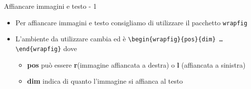 \begin{frame}{Affiancare immagini e testo - 1}

\begin{itemize}
	\item Per affiancare immagini e testo consigliamo di utilizzare il pacchetto 
	\texttt{wrapfig}
	\item L'ambiente da utilizzare cambia ed è
	\texttt{\textbackslash{}begin\{wrapfig\}\{pos\}\{dim\}
	\dots{}\textbackslash{}end\{wrapfig\}} dove
	\begin{itemize}
		\item \textbf{pos} può essere \textbf{r}(immagine affiancata a destra)
		o \textbf{l} (affiancata a sinistra)
		\item \textbf{dim} indica di quanto l'immagine si affianca al testo
	\end{itemize}
\end{itemize}

\end{frame}
